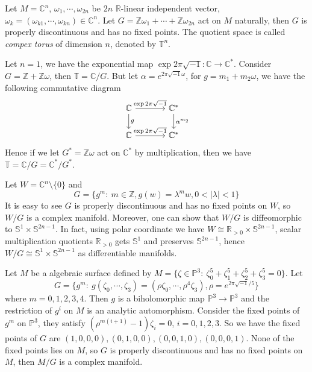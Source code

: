 \begin{eg}
    Let $M=\mathbb{C}^n$, $\omega_1,\cdots,\omega_{2n}$ be $2n$ $\mathbb{R}$-linear independent vector, $\omega_k=(\omega_{k1},\cdots,\omega_{kn})\in\mathbb{C}^n$.
    Let $G=\mathbb{Z}\omega_1+\cdots+\mathbb{Z}\omega_{2n}$ act on $M$ naturally, then $G$ is properly discontinuous and has no fixed points.
    The quotient space is called \emph{compex torus} of dimension $n$, denoted by $\mathbb{T}^n$.

    Let $n=1$, we have the exponential map $\exp{2\pi\sqrt{-1}}:\mathbb{C}\to\mathbb{C}^*$.
    Consider $G=\mathbb{Z}+\mathbb{Z}\omega$, then $\mathbb{T}=\mathbb{C}/G$.
    But let $\alpha=e^{2\pi\sqrt{-1}\omega}$, for $g=m_1+m_2\omega$, we have the following commutative diagram
    \[\begin{tikzcd}
        \mathbb{C} \ar[r, "\exp{2\pi\sqrt{-1}}"] \ar[d, "g"] &[4mm] \mathbb{C}^* \ar[d, "\alpha^{m_2}"] \\
        \mathbb{C} \ar[r, "\exp{2\pi\sqrt{-1}}"] &[4mm] \mathbb{C}^*
    \end{tikzcd}\]
    Hence if we let $G^*=\mathbb{Z}\omega$ act on $\mathbb{C}^*$ by multiplication, then we have $\mathbb{T}=\mathbb{C}/G=\mathbb{C}^*/G^*$.
\end{eg}

\begin{eg}
    Let $W=\mathbb{C}^n\setminus\{0\}$ and
    \[G=\{g^m:\ m\in\mathbb{Z},g(w)=\lambda^mw,0<|\lambda|<1\}\]
    It is easy to see $G$ is properly discontinuous and has no fixed points on $W$, so $W/G$ is a complex manifold.
    Moreover, one can show that $W/G$ is diffeomorphic to $\mathbb{S}^1\times\mathbb{S}^{2n-1}$.
    In fact, using polar coordinate we have $W\cong\mathbb{R}_{>0}\times\mathbb{S}^{2n-1}$, scalar multiplication quotients $\mathbb{R}_{>0}$ gets $\mathbb{S}^1$ and preserves $\mathbb{S}^{2n-1}$, hence $W/G\cong\mathbb{S}^1\times\mathbb{S}^{2n-1}$ as differentiable manifolds.
\end{eg}

\begin{eg}
    Let $M$ be a algebraic surface defined by $M=\{\zeta\in\mathbb{P}^3:\ \zeta_0^5+\zeta_1^5+\zeta_2^5+\zeta_3^5=0\}$.
    Let
    \[G=\{g^m:\ g(\zeta_0,\cdots,\zeta_3)=(\rho\zeta_0,\cdots,\rho^4\zeta_3),\rho=e^{2\pi\sqrt{-1}/5}\}\]
    where $m=0,1,2,3,4$.
    Then $g$ is a biholomorphic map $\mathbb{P}^3\to\mathbb{P}^3$ and the restriction of $g^i$ on $M$ is an analytic automorphism.
    Consider the fixed points of $g^m$ on $\mathbb{P}^3$, they satisfy $(\rho^{m(i+1)}-1)\zeta_i=0$, $i=0,1,2,3$.
    So we have the fixed points of $G$ are $(1,0,0,0),(0,1,0,0),(0,0,1,0),(0,0,0,1)$.
    None of the fixed points lies on $M$, so $G$ is properly discontinuous and has no fixed points on $M$, then $M/G$ is a complex manifold.
\end{eg}

